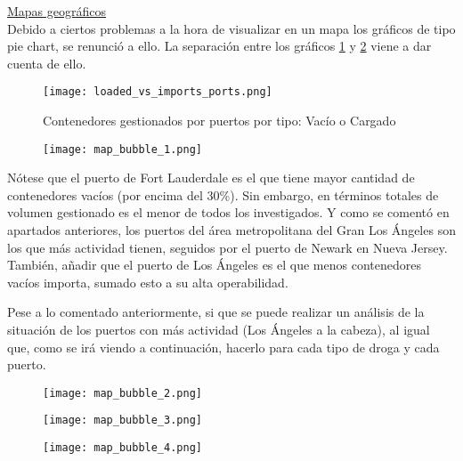 \documentclass[12pt]{article}
\begin{document}
		
		\underline{Mapas geográficos}\\
		Debido a ciertos problemas a la hora de visualizar en un mapa los gráficos de tipo pie chart, se renunció a ello. La separación entre los gráficos \ref{loaded_vs_imports_ports} y \ref{map_bubble_1} viene a dar cuenta de ello.
		
		\begin{figure}[H]
			\caption{\label{loaded_vs_imports_ports} Contenedores gestionados por puertos por tipo: Vacío o Cargado}
			\centering
			\hspace*{1cm}
			\texttt{[image: loaded\_vs\_imports\_ports.png]}
		\end{figure}
	
		
		\begin{figure}[H]
			\caption{\label{map_bubble_1} }
			\centering
			\hspace*{1cm}
			\texttt{[image: map\_bubble\_1.png]}
		\end{figure}
	
		Nótese que el puerto de Fort Lauderdale es el que tiene mayor cantidad de contenedores vacíos (por encima del 30\%). Sin embargo, en términos totales de volumen gestionado es el menor de todos los investigados. Y como se comentó en apartados anteriores, los puertos del área metropolitana del Gran Los Ángeles son los que más actividad tienen, seguidos por el puerto de Newark en Nueva Jersey. También, añadir que el puerto de Los Ángeles es el que menos contenedores vacíos importa, sumado esto a su alta operabilidad.

		Pese a lo comentado anteriormente, si que se puede realizar un análisis de la situación de los puertos con más actividad (Los Ángeles a la cabeza), al igual que, como se irá viendo a continuación, hacerlo para cada tipo de droga y cada puerto.
		
		\begin{figure}[H]
			\caption{\label{map_bubble_2} }
			\centering
			\hspace*{1cm}
			\texttt{[image: map\_bubble\_2.png]}
		\end{figure}
	
		\begin{figure}[H]
			\caption{\label{map_bubble_3} }
			\centering
			\hspace*{1cm}
			\texttt{[image: map\_bubble\_3.png]}
		\end{figure}
	
		\begin{figure}[H]
			\caption{\label{map_bubble_4} }
			\centering
			\hspace*{1cm}
			\texttt{[image: map\_bubble\_4.png]}
		\end{figure}
	
\end{document}
